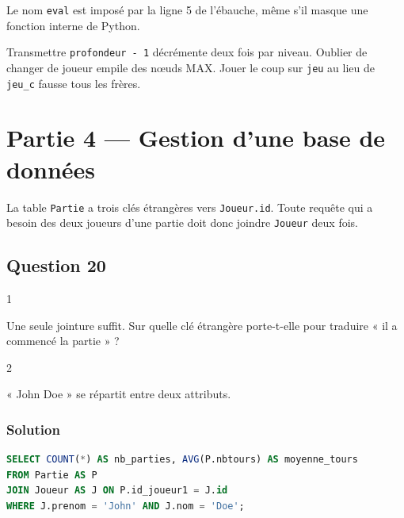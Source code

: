 \documentclass[11pt,a4paper]{article}
\begin{document}
Le nom \texttt{eval} est imposé par la ligne 5 de l'ébauche, même s'il masque une fonction interne de Python.

\begin{piege}

Transmettre \texttt{profondeur\ -\ 1} décrémente deux fois par niveau. Oublier de changer de joueur empile des nœuds MAX. Jouer le coup sur \texttt{jeu} au lieu de \texttt{jeu\_c} fausse tous les frères.

\end{piege}

\hypertarget{partie-4-gestion-dune-base-de-donnuxe9es}{%
\section{Partie 4 --- Gestion d'une base de données}\label{partie-4-gestion-dune-base-de-donnuxe9es}}

La table \texttt{Partie} a trois clés étrangères vers \texttt{Joueur.id}. Toute requête qui a besoin des deux joueurs d'une partie doit donc joindre \texttt{Joueur} deux fois.

\hypertarget{question-20}{%
\subsection{Question 20}\label{question-20}}

\begin{indication}{1}

Une seule jointure suffit. Sur quelle clé étrangère porte-t-elle pour traduire « il a commencé la partie » ?

\end{indication}

\begin{indication}{2}

« John Doe » se répartit entre deux attributs.

\end{indication}

\hypertarget{solution-19}{%
\subsubsection{Solution}\label{solution-19}}

\begin{lstlisting}[language=SQL]
SELECT COUNT(*) AS nb_parties, AVG(P.nbtours) AS moyenne_tours
FROM Partie AS P
JOIN Joueur AS J ON P.id_joueur1 = J.id
WHERE J.prenom = 'John' AND J.nom = 'Doe';
\end{lstlisting}
\end{document}
